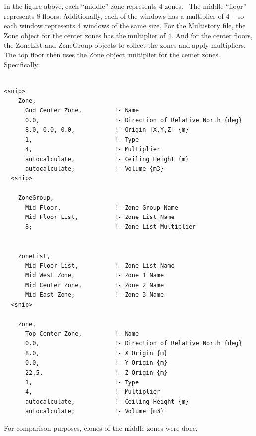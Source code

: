 In the figure above, each ``middle'' zone represents 4 zones.~ The middle ``floor'' represents 8 floors. Additionally, each of the windows has a multiplier of 4 -- so each window represents 4 windows of the same size. For the Multistory file, the Zone object for the center zones has the multiplier of 4. And for the center floors, the ZoneList and ZoneGroup objects to collect the zones and apply multipliers. The top floor then uses the Zone object multiplier for the center zones. Specifically:

\begin{lstlisting}

<snip>
    Zone,
      Gnd Center Zone,         !- Name
      0.0,                     !- Direction of Relative North {deg}
      8.0, 0.0, 0.0,           !- Origin [X,Y,Z] {m}
      1,                       !- Type
      4,                       !- Multiplier
      autocalculate,           !- Ceiling Height {m}
      autocalculate;           !- Volume {m3}
  <snip>

    ZoneGroup,
      Mid Floor,               !- Zone Group Name
      Mid Floor List,          !- Zone List Name
      8;                       !- Zone List Multiplier


    ZoneList,
      Mid Floor List,          !- Zone List Name
      Mid West Zone,           !- Zone 1 Name
      Mid Center Zone,         !- Zone 2 Name
      Mid East Zone;           !- Zone 3 Name
  <snip>

    Zone,
      Top Center Zone,         !- Name
      0.0,                     !- Direction of Relative North {deg}
      8.0,                     !- X Origin {m}
      0.0,                     !- Y Origin {m}
      22.5,                    !- Z Origin {m}
      1,                       !- Type
      4,                       !- Multiplier
      autocalculate,           !- Ceiling Height {m}
      autocalculate;           !- Volume {m3}
\end{lstlisting}

For comparison purposes, clones of the middle zones were done.

